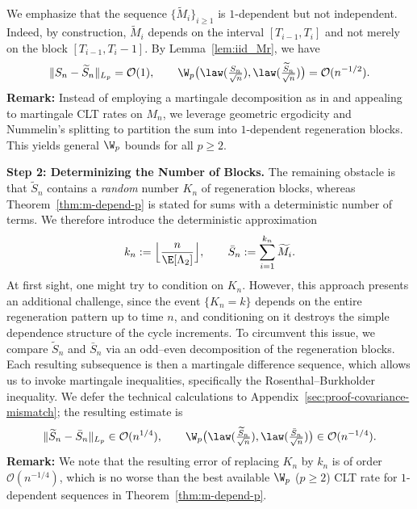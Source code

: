 \documentclass[mnsc,nonblindrev]{informs3}
\begin{document}
We emphasize that the sequence $\{\widetilde M_i\}_{i\ge 1}$ is $1$-dependent but
not independent. Indeed, by construction, $\widetilde M_i$ depends on
the interval $[T_{i-1},T_i]$ and not merely on the
block $[T_{i-1},T_i-1]$. By Lemma~\ref{lem:iid_Mr}, we have
\begin{equation}\label{eq:triangle-reminder}
\|S_n-\widetilde S_n\|_{L_p}=\mathcal O(1),
\qquad
\W_{p}\bigl(\law(\tfrac{S_n}{\sqrt n}),
\law(\tfrac{\widetilde S_n}{\sqrt n})\bigr)
=\mathcal O(n^{-1/2}).
\end{equation}
\textbf{Remark:} Instead of employing a martingale decomposition as in \cite{srikant2024rates,wu2025uncertainty} and appealing to martingale CLT rates on $M_n$, we leverage geometric ergodicity and Nummelin’s splitting to partition the sum into $1$-dependent regeneration blocks. This yields general $\W_p$ bounds for all $p\ge2$. 

\medskip
\noindent\textbf{Step 2: Determinizing the Number of Blocks.}
The remaining obstacle is that \(\widetilde S_n\) contains a \emph{random} number \(K_n\) of regeneration blocks, whereas Theorem~\ref{thm:m-depend-p} is stated for sums with a deterministic number of terms. We therefore introduce the deterministic approximation
\[
k_n:=\Bigl\lfloor \frac{n}{\E[\Lambda_2]}\Bigr\rfloor,
\qquad
\bar S_n:=\sum_{i=1}^{k_n}\widetilde M_i.
\]
At first sight, one might try to condition on \(K_n\). However, this approach presents an additional challenge, since the event \(\{K_n=k\}\) depends on the entire regeneration pattern up to time \(n\), and conditioning on it destroys the simple dependence structure of the cycle increments. To circumvent this issue, we compare \(\widetilde S_n\) and \(\bar S_n\) via an odd--even decomposition of the regeneration blocks. Each resulting subsequence is then a martingale difference sequence, which allows us to invoke martingale inequalities, specifically the Rosenthal--Burkholder inequality. We defer the technical calculations to Appendix~\ref{sec:proof-covariance-mismatch}; the resulting estimate is
\begin{equation*}
\|\widetilde  S_n - \bar S_n\|_{L_p} \in \mathcal{O}(n^{1/4}),\qquad \W_{p}\big(\law(\tfrac{\widetilde  S_n}{\sqrt{n}}),\law(\tfrac{\bar  S_n}{\sqrt{n}})\big) \in \mathcal{O}(n^{-1/4}).
\end{equation*}
\noindent\textbf{Remark:}  
We note that the resulting error of replacing $K_n$ by $k_n$ is of order $\mathcal O(n^{-1/4})$, which is no worse
than the best available $\W_p$ ($p\ge 2$) CLT rate for $1$-dependent sequences in
Theorem~\ref{thm:m-depend-p}.
\end{document}
